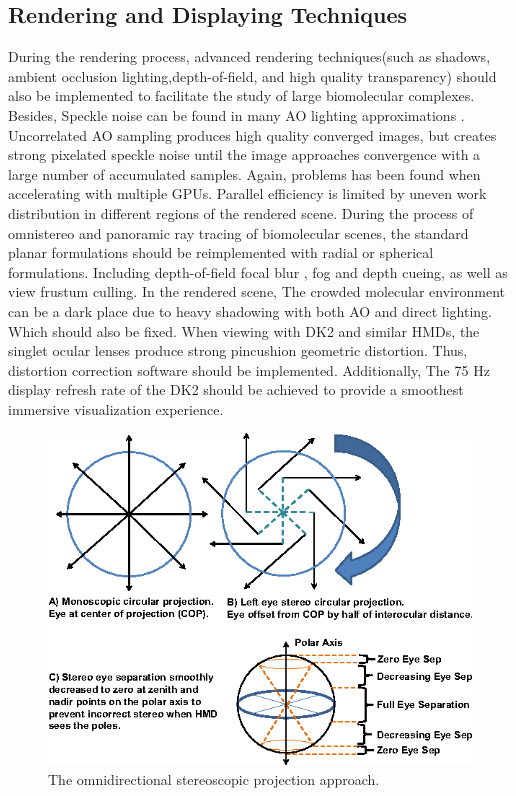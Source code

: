 \documentclass[10pt,twocolumn,letterpaper]{article}
\begin{document}
\subsection{Rendering and Displaying Techniques}

During the rendering process, advanced rendering techniques(such as shadows, ambient occlusion lighting,depth-of-field, and high quality transparency) should also be implemented to facilitate the study of large biomolecular complexes. Besides, Speckle noise can be found in many AO lighting approximations \cite{Saadia:2018}. Uncorrelated AO sampling produces high quality converged images, but creates strong pixelated speckle noise until the image approaches convergence with a large number of accumulated samples. Again, problems has been found when accelerating with multiple GPUs. Parallel efficiency is limited by uneven work distribution in different regions of the rendered scene. During the process of omnistereo and panoramic ray tracing of biomolecular scenes, the standard planar formulations should be reimplemented with radial or spherical formulations. Including depth-of-field focal blur \cite{Kosara2004SemanticDO}, fog and depth cueing, as well as view frustum culling. In the rendered scene, The crowded molecular environment can be a dark place due to heavy shadowing with both AO and direct lighting. Which should also be fixed. When viewing with DK2 and similar HMDs, the singlet ocular lenses produce strong pincushion geometric distortion. Thus, distortion correction software should be implemented. Additionally, The 75 Hz display refresh rate of the DK2 should be achieved to provide a smoothest immersive visualization experience.

\begin{figure}[h]
\begin{center}
   \includegraphics[width=1.0\linewidth]{projection-approach.png}
\end{center}
   \caption{The omnidirectional stereoscopic projection approach.}
\label{fig:projection-approach}
\end{figure}
\end{document}
